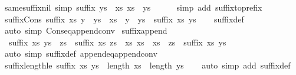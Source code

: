 \begin{isabellebody}
\ same{\isacharunderscore}suffix{\isacharunderscore}nil\ {\isacharbrackleft}simp{\isacharbrackright}{\isacharcolon}\ {\isachardoublequoteopen}suffix\ {\isacharparenleft}ys\ {\isacharat}\ xs{\isacharparenright}\ xs\ {\isacharequal}\ {\isacharparenleft}ys\ {\isacharequal}\ {\isacharbrackleft}{\isacharbrackright}{\isacharparenright}{\isachardoublequoteclose}\isanewline
%
\isadelimproof
\ \ %
\endisadelimproof
%
\isatagproof
{}\isamarkupfalse%
\ {\isacharparenleft}simp\ add{\isacharcolon}\ suffix{\isacharunderscore}to{\isacharunderscore}prefix{\isacharparenright}%
\endisatagproof
{\isafoldproof}%
%
\isadelimproof
\isanewline
%
\endisadelimproof
\isanewline
{}\isamarkupfalse%
\ suffix{\isacharunderscore}Cons{\isacharcolon}\ {\isachardoublequoteopen}suffix\ xs\ {\isacharparenleft}y\ {\isacharhash}\ ys{\isacharparenright}\ {\isasymlongleftrightarrow}\ xs\ {\isacharequal}\ y\ {\isacharhash}\ ys\ {\isasymor}\ suffix\ xs\ ys{\isachardoublequoteclose}\isanewline
%
\isadelimproof
\ \ %
\endisadelimproof
%
\isatagproof
{}\isamarkupfalse%
\ suffix{\isacharunderscore}def\ \isamarkupfalse%
\ {\isacharparenleft}auto\ simp{\isacharcolon}\ Cons{\isacharunderscore}eq{\isacharunderscore}append{\isacharunderscore}conv{\isacharparenright}%
\endisatagproof
{\isafoldproof}%
%
\isadelimproof
\isanewline
%
\endisadelimproof
\isanewline
{}\isamarkupfalse%
\ suffix{\isacharunderscore}append{\isacharcolon}\ \isanewline
\ \ {\isachardoublequoteopen}suffix\ xs\ {\isacharparenleft}ys\ {\isacharat}\ zs{\isacharparenright}\ {\isasymlongleftrightarrow}\ suffix\ xs\ zs\ {\isasymor}\ {\isacharparenleft}{\isasymexists}xs{\isacharprime}{\isachardot}\ xs\ {\isacharequal}\ xs{\isacharprime}\ {\isacharat}\ zs\ {\isasymand}\ suffix\ xs{\isacharprime}\ ys{\isacharparenright}{\isachardoublequoteclose}\isanewline
%
\isadelimproof
\ \ %
\endisadelimproof
%
\isatagproof
{}\isamarkupfalse%
\ {\isacharparenleft}auto\ simp{\isacharcolon}\ suffix{\isacharunderscore}def\ append{\isacharunderscore}eq{\isacharunderscore}append{\isacharunderscore}conv{}{\isacharparenright}%
\endisatagproof
{\isafoldproof}%
%
\isadelimproof
\isanewline
%
\endisadelimproof
\isanewline
{}\isamarkupfalse%
\ suffix{\isacharunderscore}length{\isacharunderscore}le{\isacharcolon}\ {\isachardoublequoteopen}suffix\ xs\ ys\ {\isasymLongrightarrow}\ length\ xs\ {\isasymle}\ length\ ys{\isachardoublequoteclose}\isanewline
%
\isadelimproof
\ \ %
\endisadelimproof
%
\isatagproof
{}\isamarkupfalse%
\ {\isacharparenleft}auto\ simp\ add{\isacharcolon}\ suffix{\isacharunderscore}def{\isacharparenright}%

\end{isabellebody}
